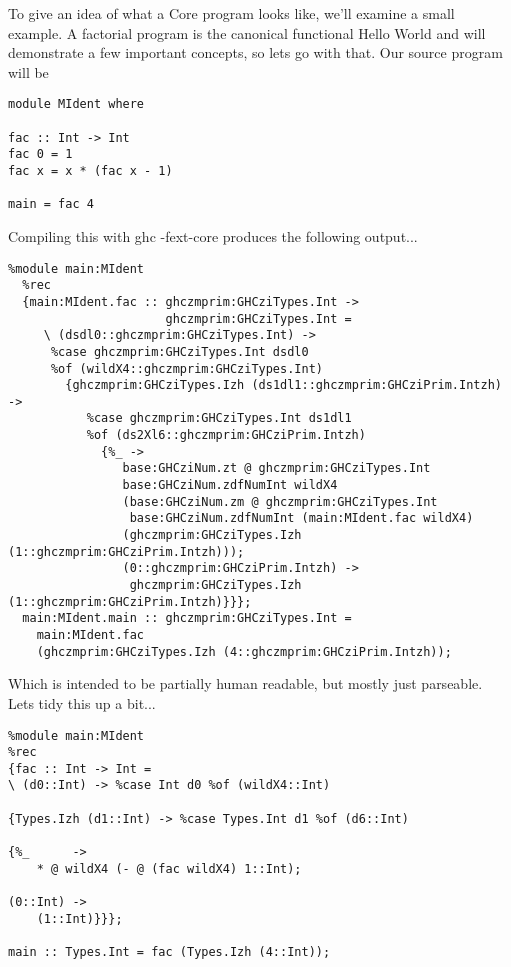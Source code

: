 To give an idea of what a Core program looks like, we'll examine a small 
example. A factorial program is the canonical functional Hello World and will
demonstrate a few important concepts, so lets go with that. Our source program
will be 

\begin{verbatim}
module MIdent where

fac :: Int -> Int
fac 0 = 1
fac x = x * (fac x - 1)

main = fac 4
\end{verbatim}

\noindent Compiling this with ghc -fext-core produces the following output...

\begin{verbatim}
%module main:MIdent
  %rec
  {main:MIdent.fac :: ghczmprim:GHCziTypes.Int ->
                      ghczmprim:GHCziTypes.Int =
     \ (dsdl0::ghczmprim:GHCziTypes.Int) ->
      %case ghczmprim:GHCziTypes.Int dsdl0
      %of (wildX4::ghczmprim:GHCziTypes.Int)
        {ghczmprim:GHCziTypes.Izh (ds1dl1::ghczmprim:GHCziPrim.Intzh) ->
           %case ghczmprim:GHCziTypes.Int ds1dl1
           %of (ds2Xl6::ghczmprim:GHCziPrim.Intzh)
             {%_ ->
                base:GHCziNum.zt @ ghczmprim:GHCziTypes.Int 
                base:GHCziNum.zdfNumInt wildX4
                (base:GHCziNum.zm @ ghczmprim:GHCziTypes.Int
                 base:GHCziNum.zdfNumInt (main:MIdent.fac wildX4)
                (ghczmprim:GHCziTypes.Izh (1::ghczmprim:GHCziPrim.Intzh)));
                (0::ghczmprim:GHCziPrim.Intzh) ->
                 ghczmprim:GHCziTypes.Izh (1::ghczmprim:GHCziPrim.Intzh)}}};
  main:MIdent.main :: ghczmprim:GHCziTypes.Int =
    main:MIdent.fac
    (ghczmprim:GHCziTypes.Izh (4::ghczmprim:GHCziPrim.Intzh));
\end{verbatim}

\noindent Which is intended to be partially human readable, but mostly
just parseable. Lets tidy this up a bit...

\begin{verbatim}
%module main:MIdent
%rec
{fac :: Int -> Int =
\ (d0::Int) -> %case Int d0 %of (wildX4::Int)

{Types.Izh (d1::Int) -> %case Types.Int d1 %of (d6::Int)

{%_      ->
    * @ wildX4 (- @ (fac wildX4) 1::Int);

(0::Int) ->
    (1::Int)}}};

main :: Types.Int = fac (Types.Izh (4::Int));
\end{verbatim}

